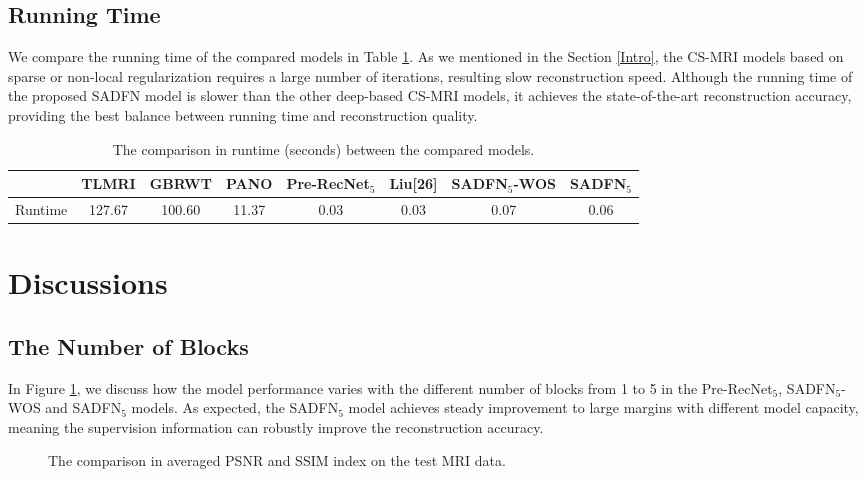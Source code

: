 \documentclass[runningheads]{llncs}
\begin{document}
\subsection{Running Time}

We compare the running time of the compared models in Table \ref{TimeCon}. As we mentioned in the Section \ref{Intro}, the CS-MRI models based on sparse or non-local regularization requires a large number of iterations, resulting slow reconstruction speed. Although the running time of the proposed SADFN model is slower than the other deep-based CS-MRI models, it achieves the state-of-the-art reconstruction accuracy, providing the best balance between running time and reconstruction quality.

\begin{table}[]
\centering
\caption{The comparison in runtime (seconds) between the compared models.}
\label{TimeCon}
\begin{tabular}{|c|c|c|c|c|c|c|c|}
\hline
                  & TLMRI  & GBRWT  & PANO  & Pre-RecNet$_5$ & Liu{[{26}]} & SADFN$_5$-WOS & SADFN$_5$ \\ \hline
Runtime & 127.67 & 100.60 & 11.37 & 0.03    & 0.03        & 0.07       & 0.06   \\ \hline
\end{tabular}
\end{table}

\section{Discussions}

\subsection{The Number of Blocks}

In Figure \ref{fig6}, we discuss how the model performance varies with the different number of blocks from 1 to 5 in the Pre-RecNet$_5$, SADFN$_5$-WOS and SADFN$_5$ models. As expected, the SADFN$_5$ model achieves steady improvement to large margins with different model capacity, meaning the supervision information can robustly improve the reconstruction accuracy.

\begin{figure}[htb!]
\begin{center}
   \caption{The comparison in averaged PSNR and SSIM index on the test MRI data.}
\label{fig6}
\end{center}
\end{figure}
\end{document}
